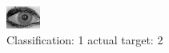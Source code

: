 \begin{figure}[h!]
\begin{center}
\includegraphics[width=0.60\columnwidth]{figures/ID2009_class_1_target_2.png}
\end{center}
\caption{ Classification: 1 actual target: 2}
\label{fig:ID2009_class_1_target_2}
\end{figure}
